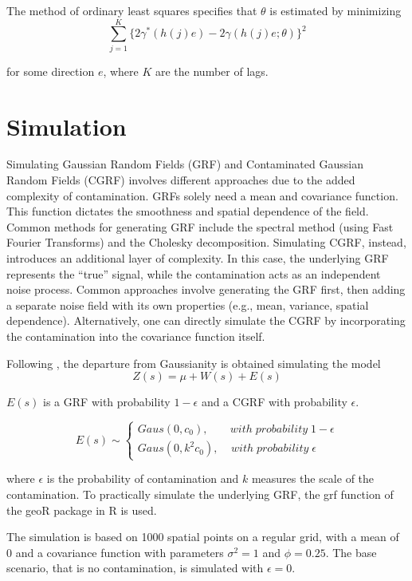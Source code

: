 \documentclass[
  12pt]{article}
\begin{document}
The method of ordinary least squares specifies that \(\theta\) is
estimated by minimizing
\[\sum\limits_{j=1}^K\{2\gamma^{*}(h(j)e)-2\gamma(h(j)e;\theta)\}^2\]

for some direction \(e\), where \(K\) are the number of lags.

\section{Simulation}\label{simulation}

Simulating Gaussian Random Fields (GRF) and Contaminated Gaussian Random
Fields (CGRF) involves different approaches due to the added complexity
of contamination. GRFs solely need a mean and covariance function. This
function dictates the smoothness and spatial dependence of the field.
Common methods for generating GRF include the spectral method (using
Fast Fourier Transforms) and the Cholesky decomposition. Simulating
CGRF, instead, introduces an additional layer of complexity. In this
case, the underlying GRF represents the ``true'' signal, while the
contamination acts as an independent noise process. Common approaches
involve generating the GRF first, then adding a separate noise field
with its own properties (e.g., mean, variance, spatial dependence).
Alternatively, one can directly simulate the CGRF by incorporating the
contamination into the covariance function itself.

Following \citet{haw:1984}, the departure from Gaussianity is obtained
simulating the model \[Z(s)=\mu+W(s)+E(s)\]

\(E(s)\) is a GRF with probability \(1 - \epsilon\) and a CGRF with
probability \(\epsilon\).

\[
E(s) \sim
\begin{cases}
  Gaus(0, c_0), \;\;\;\;\;\;\; with \; probability \; 1-\epsilon \\
  Gaus(0, k^2 c_0), \;\;\;\; with \; probability \; \epsilon
\end{cases}
\]

where \(\epsilon\) is the probability of contamination and \(k\)
measures the scale of the contamination. To practically simulate the
underlying GRF, the grf function of the geoR package in R is used.

The simulation is based on 1000 spatial points on a regular grid, with a
mean of 0 and a covariance function with parameters \(\sigma^2 = 1\) and
\(\phi = 0.25\). The base scenario, that is no contamination, is
simulated with \(\epsilon = 0\).
\end{document}
